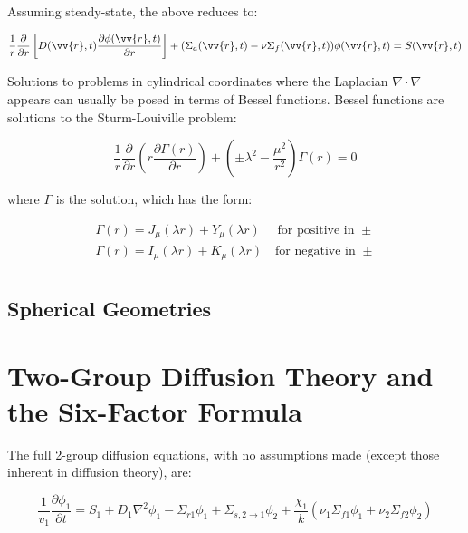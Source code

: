 \documentclass[10pt]{article}
\begin{document}
\begin{flushleft}
Assuming steady-state, the above reduces to:

\begin{equation}
\label{eq:OneSpeedDiffusionCylindrical2}
\frac{1}{r}\frac{\partial}{\partial r}\left\lbrack D(\vv{r},t)\frac{\partial\phi(\vv{r},t)}{\partial r}\right\rbrack + (\Sigma_a(\vv{r},t)-\nu\Sigma_f(\vv{r},t))\phi(\vv{r}, t) = S(\vv{r}, t)
\end{equation}

Solutions to problems in cylindrical coordinates where the Laplacian \(\nabla\cdot\nabla\) appears can usually be posed in terms of Bessel functions. Bessel functions are solutions to the Sturm-Louiville problem:

\begin{equation}
\label{eq:SturmLouiville}
\frac{1}{r}\frac{\partial}{\partial r}\left(r\frac{\partial\Gamma(r)}{\partial r}\right)+\left(\pm\lambda^2-\frac{\mu^2}{r^2}\right)\Gamma(r)=0
\end{equation}

where \(\Gamma\) is the solution, which has the form:

\begin{equation}
\begin{aligned}
\Gamma(r)=J_{\mu}(\lambda r)+Y_{\mu}(\lambda r)\quad \textrm{ for positive in }\pm\\
\Gamma(r)=I_{\mu}(\lambda r)+K_{\mu}(\lambda r)\quad\textrm{for negative in }\pm\\
\end{aligned}
\end{equation}

\subsection{Spherical Geometries}








\section{Two-Group Diffusion Theory and the Six-Factor Formula}

The full 2-group diffusion equations, with no assumptions made (except those inherent in diffusion theory), are:

\begin{equation}
\label{Group1}
\frac{1}{v_1}\frac{\partial\phi_1}{\partial t}=S_1 + D_1\nabla^2\phi_1-\Sigma_{r1}\phi_1+\Sigma_{s, 2\rightarrow 1}\phi_2+\frac{\chi_1}{k}\left(\nu_1\Sigma_{f1}\phi_1+\nu_2\Sigma_{f2}\phi_2\right)
\end{equation}


\end{flushleft}
\end{document}
